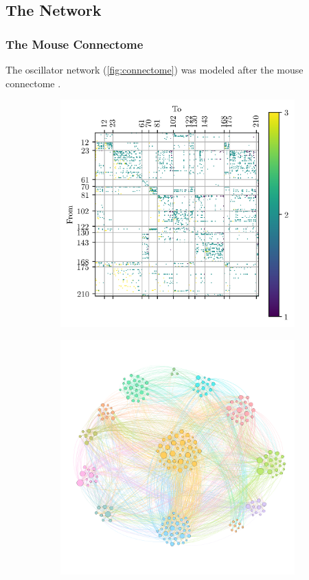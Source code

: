 \documentclass[hyperref={hidelinks}]{beamer}
\begin{document}
\subsection{The Network}
\begin{frame}
  \frametitle{The Mouse Connectome}
  The oscillator network (\cref{fig:connectome}) was modeled after the mouse connectome \cite{Oh2014}.
  \begin{figure}
    \centering
    \begin{subfigure}{0.49\textwidth}
      \centering
      \includegraphics[width=0.99\textwidth]{figure/n}
      \caption{}
      \label{fig:connectome_matrix}
    \end{subfigure}%
    \begin{subfigure}{0.49\textwidth}
      \centering
      \includegraphics[width=0.99\textwidth]{figure/network}

\end{subfigure}
\end{figure}
\end{frame}
\end{document}
